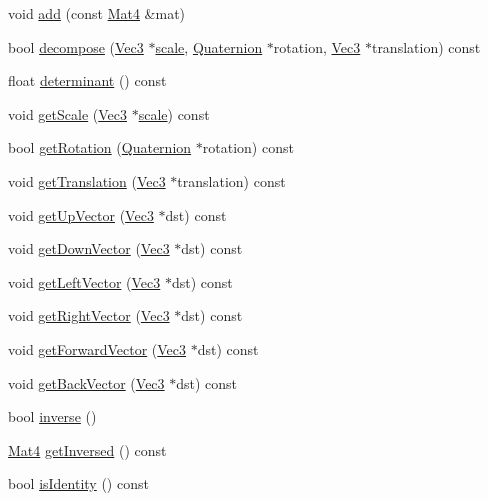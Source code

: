 \begin{DoxyCompactItemize}
\item 
void \hyperlink{classMat4_a4eaf193ce281e0ea8db5cdffcf66bda3}{add} (const \hyperlink{classMat4}{Mat4} \&mat)
\item 
bool \hyperlink{classMat4_a35e55973b2473838bd637d1de1ca220e}{decompose} (\hyperlink{classVec3}{Vec3} $\ast$\hyperlink{classMat4_a37c910140d6378e4ef7c7bb1e2d0296d}{scale}, \hyperlink{classQuaternion}{Quaternion} $\ast$rotation, \hyperlink{classVec3}{Vec3} $\ast$translation) const
\item 
float \hyperlink{classMat4_aba33e196546ec0ed036c7fe690c072ac}{determinant} () const
\item 
void \hyperlink{classMat4_a6e71ae3f0286e5ea417f237aa0cdefeb}{get\+Scale} (\hyperlink{classVec3}{Vec3} $\ast$\hyperlink{classMat4_a37c910140d6378e4ef7c7bb1e2d0296d}{scale}) const
\item 
bool \hyperlink{classMat4_a585ebfce44ed9fd746a81bfed1e3cccf}{get\+Rotation} (\hyperlink{classQuaternion}{Quaternion} $\ast$rotation) const
\item 
void \hyperlink{classMat4_a92b33d42c6766de2183ebd53269fb96c}{get\+Translation} (\hyperlink{classVec3}{Vec3} $\ast$translation) const
\item 
void \hyperlink{classMat4_af0d374798883b8b0315025707df6329d}{get\+Up\+Vector} (\hyperlink{classVec3}{Vec3} $\ast$dst) const
\item 
void \hyperlink{classMat4_a2219e0177bc699742b7f0531b10a8054}{get\+Down\+Vector} (\hyperlink{classVec3}{Vec3} $\ast$dst) const
\item 
void \hyperlink{classMat4_a53f91ec013e8a83c5b7a2395e17c626d}{get\+Left\+Vector} (\hyperlink{classVec3}{Vec3} $\ast$dst) const
\item 
void \hyperlink{classMat4_a5154fc9675a1d8fdc136c4a0ac19a41f}{get\+Right\+Vector} (\hyperlink{classVec3}{Vec3} $\ast$dst) const
\item 
void \hyperlink{classMat4_a1b53f818aab2f341af761e9ca738ab1f}{get\+Forward\+Vector} (\hyperlink{classVec3}{Vec3} $\ast$dst) const
\item 
void \hyperlink{classMat4_aa1f197b8d1e34ebf41bf7c222119b11b}{get\+Back\+Vector} (\hyperlink{classVec3}{Vec3} $\ast$dst) const
\item 
bool \hyperlink{classMat4_a22528a64ce3ee80e93150dea45408e44}{inverse} ()
\item 
\hyperlink{classMat4}{Mat4} \hyperlink{classMat4_aa49b12b2cd25b28ab50e2ac41de592b4}{get\+Inversed} () const
\item 
bool \hyperlink{classMat4_a3309850f850ef88e57e3b9b17af3371e}{is\+Identity} () const

\end{DoxyCompactItemize}
